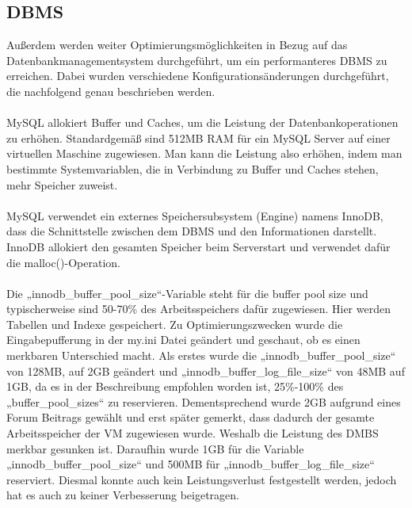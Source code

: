 \subsection{DBMS}\label{subsec:dbms}
Außerdem werden weiter Optimierungsmöglichkeiten in Bezug auf das Datenbankmanagementsystem durchgeführt, um ein performanteres DBMS zu erreichen.
Dabei wurden verschiedene Konfigurationsänderungen durchgeführt, die nachfolgend genau beschrieben werden.\\
\\
MySQL allokiert Buffer und Caches, um die Leistung der Datenbankoperationen zu erhöhen.
Standardgemäß sind 512MB RAM für ein MySQL Server auf einer virtuellen Maschine zugewiesen.
Man kann die Leistung also erhöhen, indem man bestimmte Systemvariablen, die in Verbindung zu Buffer und Caches stehen, mehr Speicher zuweist.\\
\\
MySQL verwendet ein externes Speichersubsystem (Engine) namens InnoDB, dass die Schnittstelle zwischen dem DBMS und den Informationen darstellt.
InnoDB allokiert den gesamten Speicher beim Serverstart und verwendet dafür die malloc()-Operation.\\
\\
Die „innodb\_buffer\_pool\_size“-Variable steht für die buffer pool size und typischerweise sind 50-70\% des Arbeitsspeichers dafür zugewiesen.
Hier werden Tabellen und Indexe gespeichert.
Zu Optimierungszwecken wurde die Eingabepufferung in der my.ini Datei geändert und geschaut, ob es einen merkbaren Unterschied macht.
Als erstes wurde die „innodb\_buffer\_pool\_size“ von 128MB, auf 2GB geändert und „innodb\_buffer\_log\_file\_size“ von 48MB auf 1GB, da es in der Beschreibung empfohlen worden ist, 25\%-100\% des „buffer\_pool\_sizes“ zu reservieren.
Dementsprechend wurde 2GB aufgrund eines Forum Beitrags gewählt und erst später gemerkt, dass dadurch der gesamte Arbeitsspeicher der VM zugewiesen wurde.
Weshalb die Leistung des DMBS merkbar gesunken ist.
Daraufhin wurde 1GB für die Variable „innodb\_buffer\_pool\_size“ und 500MB für „innodb\_buffer\_log\_file\_size“ reserviert.
Diesmal konnte auch kein Leistungsverlust festgestellt werden, jedoch hat es auch zu keiner Verbesserung beigetragen.~\autocite{orcale-2022}~\autocite{stackexchange-2012}
